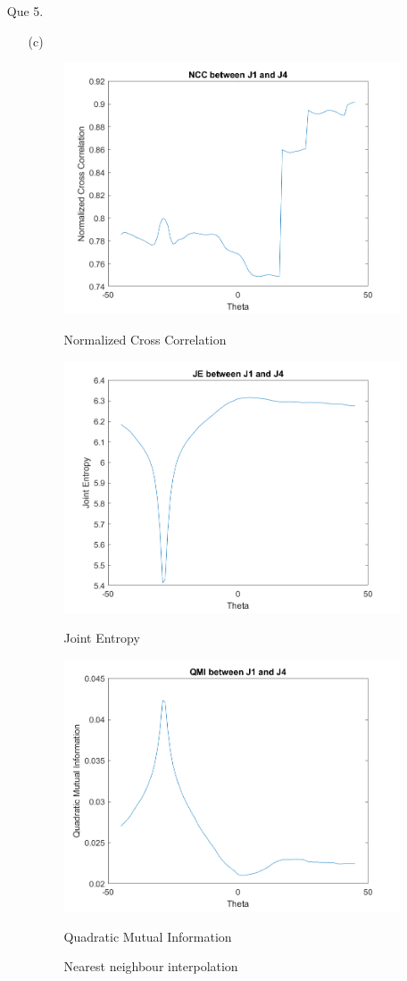\documentclass[11pt]{article}
\begin{document}
\maketitle

\begin{enumerate}
\item[Que 5.]
\begin{enumerate}

\item[(c)] \
\begin{figure}[!htb]
\centering
{}
  \includegraphics[width=100mm]{images/NCC.png}
  \caption*{Normalized Cross Correlation}
  \endminipage\hfill
 \includegraphics[width=100mm]{images/JE.png}
  \caption*{Joint Entropy}
    \endminipage\hfill
  \includegraphics[width=100mm]{images/QMI.png}
  \caption*{Quadratic Mutual Information}
  \endminipage\hfill
\caption{Nearest neighbour interpolation}
\end{figure}


\end{enumerate}
\end{enumerate}
\end{document}
